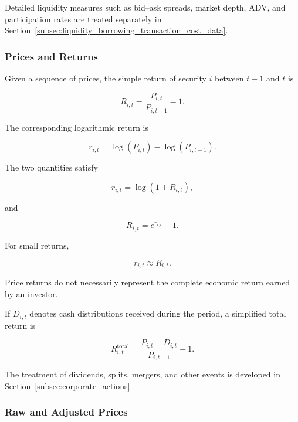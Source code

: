 \documentclass[11pt,a4paper]{article}
\begin{document}
Detailed liquidity measures such as bid--ask spreads, market depth, ADV, and
participation rates are treated separately in
Section~\ref{subsec:liquidity_borrowing_transaction_cost_data}.


\subsubsection{Prices and Returns}

Given a sequence of prices, the simple return of security $i$ between $t-1$ and
$t$ is

\begin{equation}
R_{i,t}
=
\frac{P_{i,t}}{P_{i,t-1}}-1.
\end{equation}

The corresponding logarithmic return is

\begin{equation}
r_{i,t}
=
\log(P_{i,t})
-
\log(P_{i,t-1}).
\end{equation}

The two quantities satisfy

\begin{equation}
r_{i,t}
=
\log(1+R_{i,t}),
\end{equation}

and

\begin{equation}
R_{i,t}
=
e^{r_{i,t}}-1.
\end{equation}

For small returns,

\begin{equation}
r_{i,t}
\approx
R_{i,t}.
\end{equation}

Price returns do not necessarily represent the complete economic return earned
by an investor.

If $D_{i,t}$ denotes cash distributions received during the period, a
simplified total return is

\begin{equation}
\boxed{
R_{i,t}^{\mathrm{total}}
=
\frac{
P_{i,t}
+
D_{i,t}
}{
P_{i,t-1}
}
-1.
}
\end{equation}

The treatment of dividends, splits, mergers, and other events is developed in
Section~\ref{subsec:corporate_actions}.


\subsubsection{Raw and Adjusted Prices}
\end{document}
